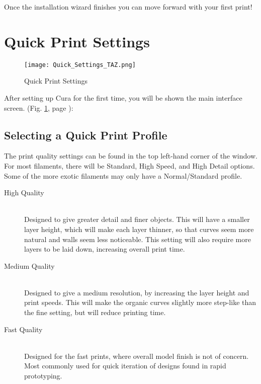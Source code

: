 Once the installation wizard finishes you can move forward with your first print!


\section{Quick Print Settings}
\begin{figure}[H]
\centering
\texttt{[image: Quick\_Settings\_TAZ.png]}
\caption{Quick Print Settings}
\label{fig:Cura}
\end{figure} 
After setting up Cura for the first time, you will be shown the main interface screen. (Fig. \ref{fig:Cura}, page \pageref{fig:Cura}): 

\subsection{Selecting a Quick Print Profile}
The print quality settings can be found in the top left-hand corner of the window. For most filaments, there will be Standard, High Speed, and High Detail options. Some of the more exotic filaments may only have a Normal/Standard profile.

\begin{description}
\item[High Quality] \hfill \\
Designed to give greater detail and finer objects. This will have a smaller layer height, which will make each layer thinner, so that curves seem more natural and walls seem less noticeable. This setting will also require more layers to be laid down, increasing overall print time.

\item[Medium Quality] \hfill \\
Designed to give a medium resolution, by increasing the layer height and print speeds. This will make the organic curves slightly more step-like than the fine setting, but will reduce printing time.

\item[Fast Quality] \hfill \\
Designed for the fast prints, where overall model finish is not of concern. Most commonly used for quick iteration of designs found in rapid prototyping.
\end{description}

